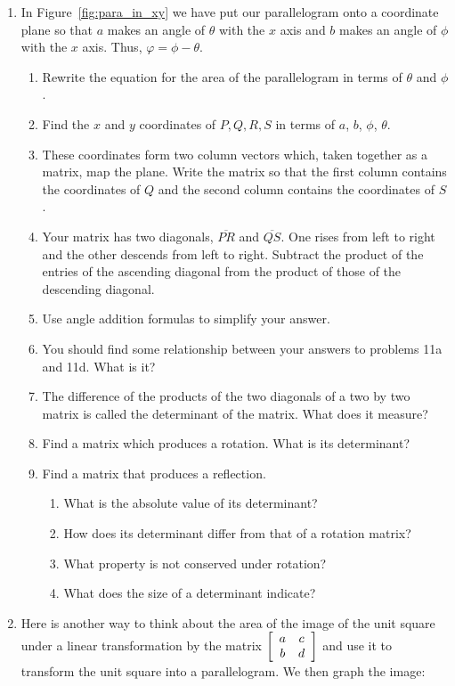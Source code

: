 \documentclass[../gatm.tex]{subfiles}
\begin{document}
\begin{enumerate}
\item In Figure~\ref{fig:para_in_xy} we have put our parallelogram onto a coordinate plane so that $a$ makes an angle of $\theta$ with the $x$ axis and $b$ makes an angle of $\phi$ with the $x$ axis. Thus, $\varphi=\phi-\theta$.
\begin{enumerate}
\item Rewrite the equation for the area of the parallelogram in terms of $\theta$ and $\phi$.
\item Find the $x$ and $y$ coordinates of $P,Q,R,S$ in terms of $a$, $b$, $\phi$, $\theta$.
\item These coordinates form two column vectors which, taken together as a matrix, map the plane. Write the matrix so that the first column contains the coordinates of $Q$ and the second column contains the coordinates of $S$.
\item Your matrix has two diagonals, $\overline{PR}$ and $\overline{QS}$. One rises from left to right and the other descends from left to right. Subtract the product of the entries of the ascending diagonal from the product of those of the descending diagonal.
\item Use angle addition formulas to simplify your answer.
\item You should find some relationship between your answers to problems 11a and 11d. What is it?
\item The difference of the products of the two diagonals of a two by two matrix is called the determinant of the matrix. What does it measure?
\item Find a matrix which produces a rotation. What is its determinant?
\item Find a matrix that produces a reflection.
\begin{enumerate}
\item What is the absolute value of its determinant?
\item How does its determinant differ from that of a rotation matrix?
\item What property is not conserved under rotation?
\item What does the size of a determinant indicate?
\end{enumerate}
\end{enumerate}
\item Here is another way to think about the area of the image of the unit square under a linear transformation by the matrix $\left[\begin{array}{cc} a & c \\ b & d \end{array}\right]$ and use it to transform the unit square into a parallelogram. We then graph the image:

\end{enumerate}
\end{document}
